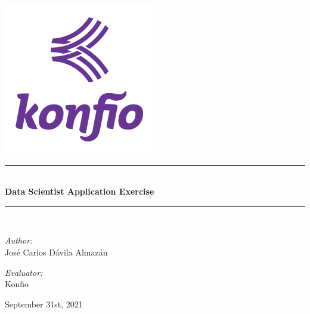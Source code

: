 \begin{titlepage}
 
\begin{center}
\newcommand{\HRule}{\rule{\linewidth}{0.5mm}}

\includegraphics[scale=1]{Images/Konfio_Logo.png}\vspace*{1cm}\\[5pt]

\HRule \\[0.4cm]
{ \huge \bfseries Data Scientist Application Exercise}\\[0.4cm]
\HRule \\[1.5cm]
\begin{minipage}{0.475\textwidth}
\begin{flushleft} \large
\emph{Author:}\\

José Carlos Dávila Almazán\\



\end{flushleft}
\end{minipage}
\begin{minipage}{0.5\textwidth}
\begin{flushright} \large
\emph{Evaluator:} \\
Konfio
\end{flushright}

\end{minipage}
\vfill
{\large September 31st, 2021}
\end{center}
\end{titlepage}
